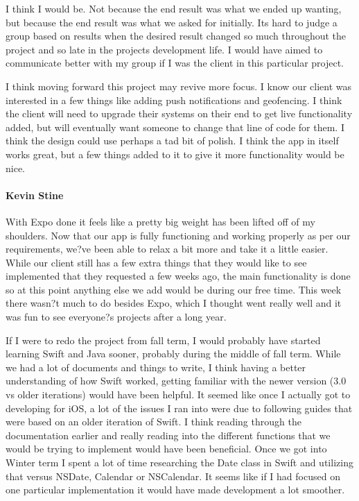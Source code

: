 I think I would be. Not because the end result was what we ended up wanting, but because the end result was what we asked for initially. Its hard to judge a group based on results when the desired result changed so much throughout the project and so late in the projects development life. I would have aimed to communicate better with my group if I was the client in this particular project.

I think moving forward this project may revive more focus. I know our client was interested in a few things like adding push notifications and geofencing. I think the client will need to upgrade their systems on their end to get live functionality added, but will eventually want someone to change that line of code for them. I think the design could use perhaps a tad bit of polish. I think the app in itself works great, but a few things added to it to give it more functionality would be nice.
			
			\paragraph{Kevin Stine}
			With Expo done it feels like a pretty big weight has been lifted off of my shoulders. Now that our app is fully functioning and working properly as per our requirements, we?ve been able to relax a bit more and take it a little easier. While our client still has a few extra things that they would like to see implemented that they requested a few weeks ago, the main functionality is done so at this point anything else we add would be during our free time. This week there wasn?t much to do besides Expo, which I thought went really well and it was fun to see everyone?s projects after a long year.

If I were to redo the project from fall term, I would probably have started learning Swift and Java sooner, probably during the middle of fall term. While we had a lot of documents and things to write, I think having a better understanding of how Swift worked, getting familiar with the newer version (3.0 vs older iterations) would have been helpful. It seemed like once I actually got to developing for iOS, a lot of the issues I ran into were due to following guides that were based on an older iteration of Swift. I think reading through the documentation earlier and really reading into the different functions that we would be trying to implement would have been beneficial. Once we got into Winter term I spent a lot of time researching the Date class in Swift and utilizing that versus NSDate, Calendar or NSCalendar. It seems like if I had focused on one particular implementation it would have made development a lot smoother.

